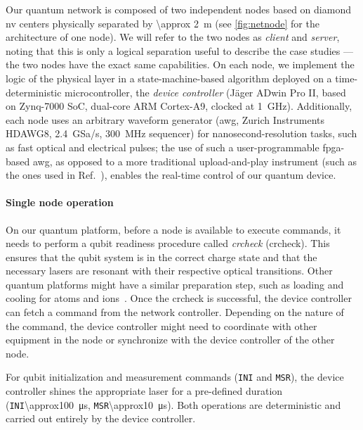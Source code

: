 Our quantum network is composed of two independent nodes based on diamond \acrshort{nv} centers
physically separated by \qty{\approx 2}{m} (see \cref{fig:netnode} for the architecture of one
node). We will refer to the two nodes as \emph{client} and \emph{server}, noting that this is only a
logical separation useful to describe the case studies --- the two nodes have the exact same
capabilities. On each node, we implement the logic of the physical layer in a state-machine-based
algorithm deployed on a time-deterministic microcontroller, the \emph{device controller} (J\"ager
ADwin Pro II, based on Zynq-7000 SoC, dual-core ARM Cortex-A9, clocked at \qty{1}{\GHz}).
Additionally, each node uses an arbitrary waveform generator (\acrshort{awg}, Zurich Instruments
HDAWG8, \qty{2.4}{GSa/s}, \qty{300}{\MHz} sequencer) for nanosecond-resolution tasks, such as fast
optical and electrical pulses; the use of such a user-programmable \acrshort{fpga}-based
\acrshort{awg}, as opposed to a more traditional upload-and-play instrument (such as the ones used
in Ref.~\cite{pompili_2021_multinode}), enables the real-time control of our quantum device.

\paragraph{Single node operation}

On our quantum platform, before a node is available to execute commands, it needs to perform a qubit
readiness procedure called \emph{\acrlong{crcheck}} (\acrshort{crcheck}). This ensures that the
qubit system is in the correct charge state and that the necessary lasers are resonant with their
respective optical transitions. Other quantum platforms might have a similar preparation step, such
as loading and cooling for atoms and ions~\cite{stephenson_2020_highrate, ritter_2012_elementary}.
Once the \acrshort{crcheck} is successful, the device controller can fetch a command from the
network controller. Depending on the nature of the command, the device controller might need to
coordinate with other equipment in the node or synchronize with the device controller of the other
node.

For qubit initialization and measurement commands (\texttt{INI} and \texttt{MSR}), the device
controller shines the appropriate laser for a pre-defined duration
(\texttt{INI}\qty{\approx100}{\us}, \texttt{MSR}\qty{\approx10}{\us}). Both operations are
deterministic and carried out entirely by the device controller.

